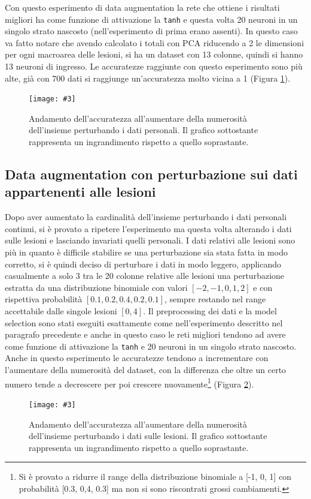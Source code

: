 \documentclass[12pt, twoside, letterpaper]{report}
\newcommand{\img}[4] {
	\begin{figure}
		\centering
		\texttt{[image: \#3]}\\
		\caption{#1}
		\label{fig:#4}
	\end{figure}
}
\begin{document}
			Con questo esperimento di data augmentation la rete che ottiene i risultati migliori ha come funzione di attivazione la \texttt{tanh} e questa volta 20 neuroni in un singolo strato nascosto (nell'esperimento di prima erano assenti). In questo caso va fatto notare che avendo calcolato i totali con PCA riducendo a 2 le dimensioni per ogni macroarea delle lesioni, si ha un dataset con 13 colonne, quindi si hanno 13 neuroni di ingresso. Le accuratezze raggiunte con questo esperimento sono più alte, già con 700 dati si raggiunge un'accuratezza molto vicina a 1 (Figura \ref{fig:accuracy_data_aug_pers}).
			
			\img{Andamento dell'accuratezza all'aumentare della numerosità dell'insieme perturbando i dati personali. Il grafico sottostante rappresenta un ingrandimento rispetto a quello soprastante.}{0.35}{accuracy_data_aug_pers.png}{accuracy_data_aug_pers}
			
		\subsection{Data augmentation con perturbazione sui dati appartenenti alle lesioni} \label{sec:data_aug_les}
			Dopo aver aumentato la cardinalità dell'insieme perturbando i dati personali continui, si è provato a ripetere l'esperimento ma questa volta alterando i dati sulle lesioni e lasciando invariati quelli personali. I dati relativi alle lesioni sono più  in quanto è difficile stabilire se una perturbazione sia stata fatta in modo corretto, si è quindi deciso di perturbare i dati in modo leggero, applicando casualmente a solo 3 tra le 20 colonne relative alle lesioni una perturbazione estratta da una distribuzione binomiale con valori $[-2, -1, 0, 1, 2]$ e con rispettiva probabilità $[0.1, 0.2, 0.4, 0.2, 0.1]$, sempre restando nel range accettabile dalle singole lesioni $[0,4]$. Il preprocessing dei dati e la model selection sono stati eseguiti esattamente come nell'esperimento descritto nel paragrafo precedente e anche in questo caso le reti migliori tendono ad avere come funzione di attivazione la \texttt{tanh} e 20 neuroni in un singolo strato nascosto. Anche in questo esperimento le accuratezze tendono a incrementare con l'aumentare della numerosità del dataset, con la differenza che oltre un certo numero tende a decrescere per poi crescere nuovamente\footnote{Si è provato a ridurre il range della distribuzione binomiale a [-1, 0, 1] con probabilità [0.3, 0,4, 0.3] ma non si sono riscontrati grossi cambiamenti.} (Figura \ref{fig:accuracy_data_aug_lesioni}). 
			\img{Andamento dell'accuratezza all'aumentare della numerosità dell'insieme perturbando i dati sulle lesioni. Il grafico sottostante rappresenta un ingrandimento rispetto a quello soprastante.}{0.35}{accuracy_data_aug_lesioni.png}{accuracy_data_aug_lesioni}
			
\end{document}
